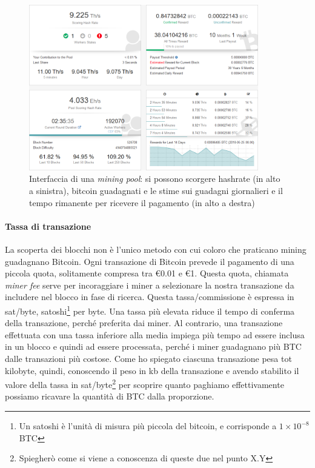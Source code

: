 \documentclass {article}
\begin{document}
\vspace {0.5cm}
\begin{figure}[htb!]
\includegraphics [width = 10cm] {dashboard.png}
\centering
\caption {Interfaccia di una \textit{mining pool}: si possono scorgere hashrate (in alto a sinistra), bitcoin guadagnati e le stime sui guadagni giornalieri e il tempo rimanente per ricevere il pagamento (in alto a destra)}
\end{figure}
\vspace {0.2cm}

\paragraph {Tassa di transazione}

La scoperta dei blocchi non è l'unico metodo con cui coloro che praticano mining guadagnano Bitcoin.
Ogni transazione di Bitcoin prevede il pagamento di una piccola quota, solitamente compresa tra \euro{0.01} e \euro{1}.
Questa quota, chiamata \textit{miner fee} serve per incoraggiare i miner a selezionare la nostra transazione da includere nel blocco in fase di ricerca.
Questa tassa/commissione è espressa in sat/byte, satoshi\footnote{Un satoshi è l'unità di misura più piccola del bitcoin, e corrisponde a $1 \times 10^{-8}$ BTC} per byte.
Una tassa più elevata riduce il tempo di conferma della transazione, perché preferita dai miner. Al contrario, una transazione effettuata con una tassa inferiore alla media impiega più tempo ad essere inclusa in un blocco e quindi ad essere processata, perché i miner guadagnano più BTC dalle transazioni più costose.
Come ho spiegato ciascuna transazione pesa tot kilobyte, quindi, conoscendo il peso in kb della transazione e avendo stabilito il valore della tassa in sat/byte\footnote{Spiegherò come si viene a conoscenza di queste due nel punto X.Y} per scoprire quanto paghiamo effettivamente possiamo ricavare la quantità di BTC dalla proporzione.
\end{document}
